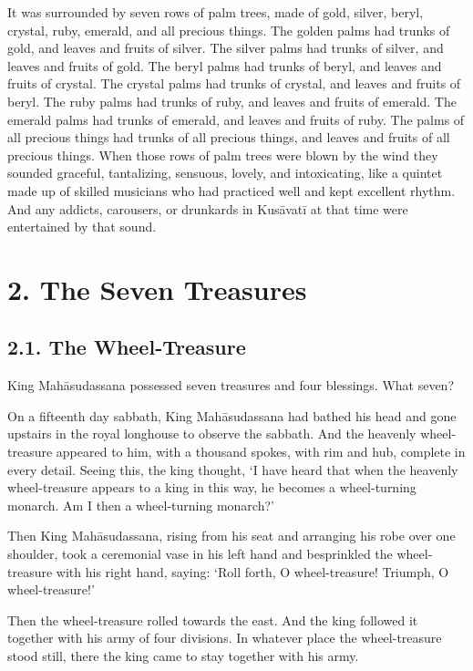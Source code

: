 \documentclass[12pt,openany]{book}%
\begin{document}
It was surrounded by seven rows of palm trees, made of gold, silver, beryl, crystal, ruby, emerald, and all precious things. The golden palms had trunks of gold, and leaves and fruits of silver. The silver palms had trunks of silver, and leaves and fruits of gold. The beryl palms had trunks of beryl, and leaves and fruits of crystal. The crystal palms had trunks of crystal, and leaves and fruits of beryl. The ruby palms had trunks of ruby, and leaves and fruits of emerald. The emerald palms had trunks of emerald, and leaves and fruits of ruby. The palms of all precious things had trunks of all precious things, and leaves and fruits of all precious things. When those rows of palm trees were blown by the wind they sounded graceful, tantalizing, sensuous, lovely, and intoxicating, like a quintet made up of skilled musicians who had practiced well and kept excellent rhythm. And any addicts, carousers, or drunkards in \textsanskrit{Kusāvatī} at that time were entertained by that sound. 

\section*{2. The Seven Treasures }

\subsection*{2.1. The Wheel-Treasure }

King \textsanskrit{Mahāsudassana} possessed seven treasures and four blessings. What seven? 

On a fifteenth day sabbath, King \textsanskrit{Mahāsudassana} had bathed his head and gone upstairs in the royal longhouse to observe the sabbath. And the heavenly wheel-treasure appeared to him, with a thousand spokes, with rim and hub, complete in every detail. Seeing this, the king thought, ‘I have heard that when the heavenly wheel-treasure appears to a king in this way, he becomes a wheel-turning monarch. Am I then a wheel-turning monarch?’ 

Then King \textsanskrit{Mahāsudassana}, rising from his seat and arranging his robe over one shoulder, took a ceremonial vase in his left hand and besprinkled the wheel-treasure with his right hand, saying: ‘Roll forth, O wheel-treasure! Triumph, O wheel-treasure!’ 

Then the wheel-treasure rolled towards the east. And the king followed it together with his army of four divisions. In whatever place the wheel-treasure stood still, there the king came to stay together with his army. 
\end{document}
